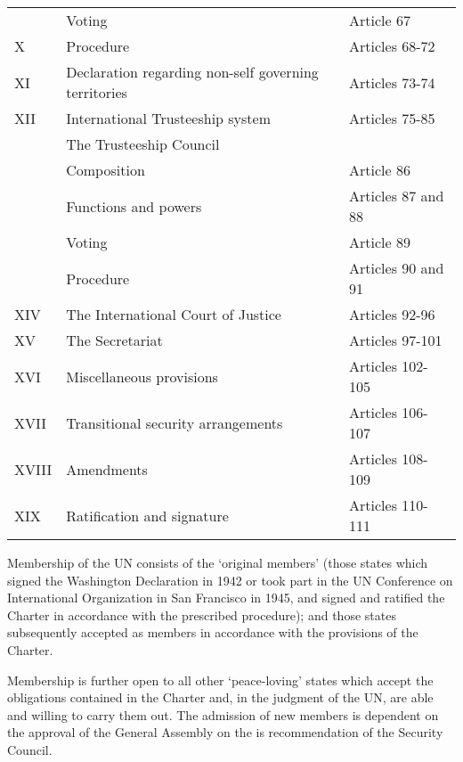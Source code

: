 \documentclass[
  openany]{book}
\begin{document}
\begin{longtable}[t]{l>{\raggedright\arraybackslash}p{20em}>{\raggedright\arraybackslash}p{10em}}
\cmidrule{2-3}
\rowcolor{gray!6}   & Voting & Article 67\\
\cmidrule{2-3}
\multirow{-5}{*}{\raggedright\arraybackslash X} & Procedure & Articles 68-72\\
\cmidrule{1-3}
\rowcolor{gray!6}  XI & Declaration regarding non-self governing territories & Articles 73-74\\
\cmidrule{1-3}
XII & International Trusteeship system & Articles 75-85\\
\cmidrule{1-3}
\rowcolor{gray!6}   & The Trusteeship Council & \\
\cmidrule{2-3}
 & Composition & Article 86\\
\cmidrule{2-3}
\rowcolor{gray!6}   & Functions and powers & Articles 87 and 88\\
\cmidrule{2-3}
 & Voting & Article 89\\
\cmidrule{2-3}
\rowcolor{gray!6}  \multirow{-5}{*}{\raggedright\arraybackslash XIII} & Procedure & Articles 90 and 91\\
\cmidrule{1-3}
XIV & The International Court of Justice & Articles 92-96\\
\cmidrule{1-3}
\rowcolor{gray!6}  XV & The Secretariat & Articles 97-101\\
\cmidrule{1-3}
XVI & Miscellaneous provisions & Articles 102-105\\
\cmidrule{1-3}
\rowcolor{gray!6}  XVII & Transitional security arrangements & Articles 106-107\\
\cmidrule{1-3}
XVIII & Amendments & Articles 108-109\\
\cmidrule{1-3}
\rowcolor{gray!6}  XIX & Ratification and signature & Articles 110-111\\
\bottomrule
\end{longtable}
\endgroup{}

Membership of the UN consists of the `original members' (those states which signed the Washington Declaration in 1942 or took part in the UN Conference on International Organization in San Francisco in 1945, and signed and ratified the Charter in accordance with the prescribed procedure); and those states subsequently accepted as members in accordance with the provisions of the Charter.

Membership is further open to all other `peace-loving' states which accept the obligations contained in the Charter and, in the judgment of the UN, are able and willing to carry them out. The admission of new members is dependent on the approval of the General Assembly on the is recommendation of the Security Council.
\end{document}
